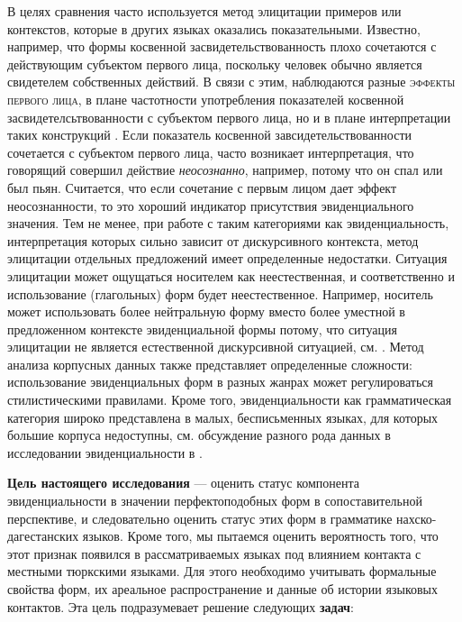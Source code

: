 \par В целях сравнения часто используется метод элицитации примеров или контекстов, которые в других языках оказались показательными. Известно, например, что формы косвенной засвидетельствованность плохо сочетаются с действующим субъектом первого лица, поскольку человек обычно является свидетелем собственных действий. В связи с этим, наблюдаются разные \textsc{эффекты первого лица}, в плане частотности употребления показателей косвенной засвидетелсьтвованности с субъектом первого лица, но и в плане интерпретации таких конструкций \citep{curnow2002}. Если показатель косвенной завсидетельствованности сочетается с субъектом первого лица, часто возникает интерпретация, что говорящий совершил действие \textit{неосознанно}, например, потому что он спал или был пьян. Считается, что если сочетание с первым лицом дает эффект неосознанности, то это хороший индикатор присутствия эвиденциального значения. Тем не менее, при работе с таким категориями как эвиденциальность, интерпретация которых сильно зависит от дискурсивного контекста, метод элицитации отдельных предложений имеет определенные недостатки. Ситуация элицитации может ощущаться носителем как неестественная, и соответственно и использование (глагольных) форм будет неестественное. Например, носитель может использовать более нейтральную форму вместо более уместной в предложенном контексте эвиденциальной формы потому, что ситуация элицитации не является естественной дискурсивной ситуацией, см. \citep[18]{aikhenvald2004}. Метод анализа корпусных данных также представляет определенные сложности: использование эвиденциальных форм в разных жанрах может регулироваться стилистическими правилами. Кроме того, эвиденциальности как грамматическая категория широко представлена в малых, бесписьменных языках, для которых большие корпуса недоступны, см. обсуждение разного рода данных в исследовании эвиденциальности в \citep{kittila2018}.
\par \textbf{Цель настоящего исследования} --- оценить статус компонента эвиденциальности в значении перфектоподобных форм в сопоставительной перспективе, и следовательно оценить статус этих форм в грамматике нахско-дагестанских языков. Кроме того, мы пытаемся оценить вероятность того, что этот признак появился в рассматриваемых языках под влиянием контакта с местными тюркскими языками. Для этого необходимо учитывать формальные свойства форм, их ареальное распространение и данные об истории языковых контактов. Эта цель подразумевает решение следующих \textbf{задач}:

